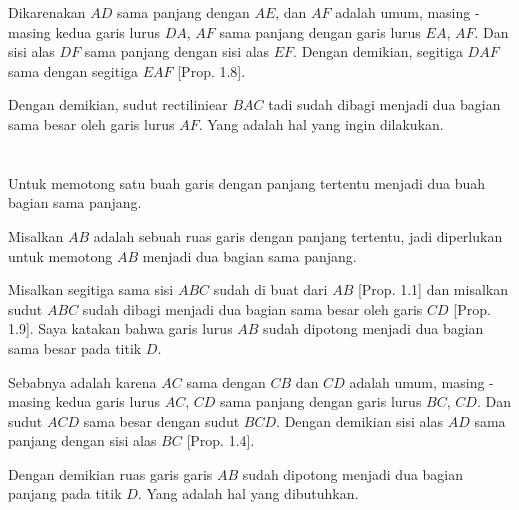 \documentclass[a4paper]{book}
\begin{document}
Dikarenakan $AD$ sama panjang dengan $AE$, dan $AF$ adalah umum, masing - masing
kedua garis lurus $DA$, $AF$ sama panjang dengan garis lurus $EA$, $AF$. Dan 
sisi alas $DF$ sama panjang dengan sisi alas $EF$. Dengan demikian, segitiga
$DAF$ sama dengan segitiga $EAF$ [Prop. 1.8].

Dengan demikian, sudut rectiliniear $BAC$ tadi sudah dibagi menjadi dua bagian
sama besar oleh garis lurus $AF$. Yang adalah hal yang ingin dilakukan.

\section*{\centering \thesection} 
Untuk memotong satu buah garis dengan panjang tertentu menjadi dua buah bagian 
sama panjang.

\begin{center}
\end{center}

Misalkan $AB$ adalah sebuah ruas garis dengan panjang tertentu, jadi diperlukan
untuk memotong $AB$ menjadi dua bagian sama panjang.

Misalkan segitiga sama sisi $ABC$ sudah di buat dari $AB$ [Prop. 1.1] dan
misalkan sudut $ABC$ sudah dibagi menjadi dua bagian sama besar oleh garis 
$CD$ [Prop. 1.9]. Saya katakan bahwa garis lurus $AB$ sudah dipotong menjadi
dua bagian sama besar pada titik $D$.

Sebabnya adalah karena $AC$ sama dengan $CB$ dan $CD$ adalah umum, masing - masing
kedua garis lurus $AC$, $CD$ sama panjang dengan garis lurus $BC$, $CD$. Dan 
sudut $ACD$ sama besar dengan sudut $BCD$. Dengan demikian sisi alas $AD$ sama
panjang dengan sisi alas $BC$ [Prop. 1.4].

Dengan demikian ruas garis garis $AB$ sudah dipotong menjadi dua bagian panjang
pada titik $D$. Yang adalah hal yang dibutuhkan.

\end{document}
